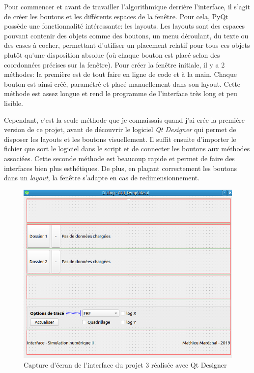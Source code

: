 \documentclass[a4paper, 11pt]{article}
\begin{document}
Pour commencer et avant de travailler l'algorithmique derrière l'interface, il s'agit de créer les boutons et les différents espaces de la fenêtre. Pour cela, PyQt possède une fonctionnalité intéressante: les layouts. Les layouts sont des espaces pouvant contenir des objets comme des boutons, un menu déroulant, du texte ou des cases à cocher, permettant d'utiliser un placement relatif pour tous ces objets plutôt qu'une disposition absolue (où chaque bouton est placé selon des coordonnées précises sur la fenêtre). Pour créer la fenêtre initiale, il y a 2 méthodes: la première est de tout faire en ligne de code et à la main. Chaque bouton est ainsi créé, paramétré et placé manuellement dans son layout. Cette méthode est assez longue et rend le programme de l'interface très long et peu lisible. 

Cependant, c'est la seule méthode que je connaissais quand j'ai crée la première version de ce projet, avant de découvrir le logiciel \textit{Qt Designer} qui permet de disposer les layouts et les boutons visuellement. Il suffit ensuite d'importer le fichier que sort le logiciel dans le script et de connecter les boutons aux méthodes associées. Cette seconde méthode est beaucoup rapide et permet de faire des interfaces bien plus esthétiques. De plus, en plaçant correctement les boutons dans un \textit{layout}, la fenêtre s'adapte en cas de redimensionnement.

\begin{figure}[H]
	\centering
	\includegraphics[scale=0.3]{Figures/interf_qt.png}
	\caption{Capture d'écran de l'interface du projet 3 réalisée avec Qt Designer}
	\label{fig:interf_qt} 
\end{figure}
\end{document}
